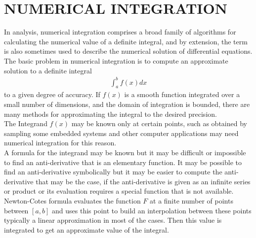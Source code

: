 \documentclass[12pt]{report}
\newcommand{\sps}{\\[0.2cm]}
\begin{document}
	
	
	
	
	
	
	
	
%	
%
%	
%	
%
%	
%	
	

	
	\chapter{NUMERICAL INTEGRATION}
	In analysis, numerical integration comprises a broad family of algorithms for calculating the numerical value of a definite integral, and by extension, the term is also sometimes used to describe the numerical solution of differential equations.\sps
	The basic problem in numerical integration is to compute an approximate solution to a definite integral
	\begin{eqnarray}
		\int_a^b f(x) dx
	\end{eqnarray}
	to a given degree of accuracy. If $f(x)$ is a smooth function integrated over a small number of dimensions, and the domain of integration is bounded, there are many methods for approximating the integral to the desired precision.\sps
	The Integrand $f(x)$ may be known only at certain points, such as obtained by sampling some embedded systems and other computer applications may need numerical integration for this reason.\sps
	A formula for the integrand may be known but it may be difficult or impossible to find an anti-derivative that is an elementary function. It may be possible to find an anti-derivative symbolically but it may be easier to compute the anti-derivative that may be the case, if the anti-derivative is given as an infinite series or product or its evaluation requires a special function that is not available.\sps
	Newton-Cotes formula evaluates the function $F$ at a finite number of points between $[a,b]$ and uses this point to build an interpolation between these points typically a linear approximation in most of the cases. Then this value is integrated to get an approximate value of the integral.
	
\end{document}
